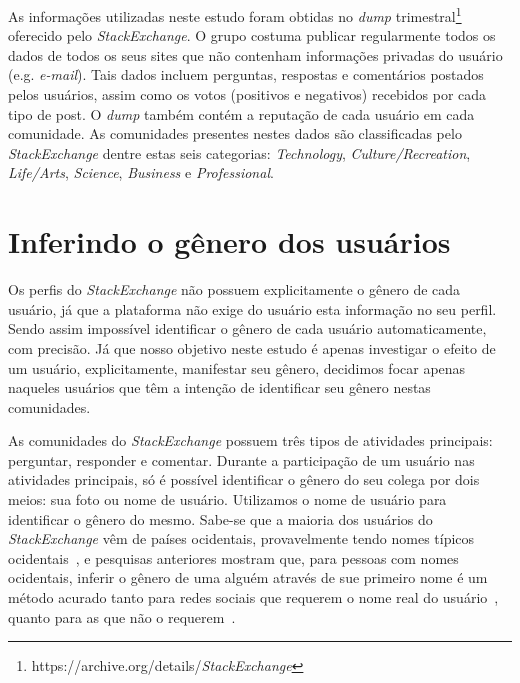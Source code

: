 As informações utilizadas neste estudo foram obtidas no \emph{dump} trimestral\footnote{https://archive.org/details/\emph{StackExchange}} oferecido pelo \emph{StackExchange}. O grupo costuma publicar regularmente todos os dados de todos os seus sites que não contenham informações privadas do usuário (e.g. \emph{e-mail}). Tais dados incluem perguntas, respostas e comentários postados pelos usuários, assim como os votos (positivos e negativos) recebidos por cada tipo de post. O \emph{dump} também contém a reputação de cada usuário em cada comunidade. As comunidades presentes nestes dados são classificadas pelo \emph{StackExchange} dentre estas seis categorias: \emph{Technology}, \emph{Culture/Recreation}, \emph{Life/Arts}, \emph{Science}, \emph{Business} e \emph{Professional}.

\section{Inferindo o gênero dos usuários}

Os perfis do \emph{StackExchange} não possuem explicitamente o gênero de cada usuário, já que a plataforma não exige do usuário esta informação no seu perfil. Sendo assim impossível identificar o gênero de cada usuário automaticamente, com precisão. Já que nosso objetivo neste estudo é apenas investigar o efeito de um usuário, explicitamente, manifestar seu gênero, decidimos focar apenas naqueles usuários que têm a intenção de identificar seu gênero nestas comunidades.

As comunidades do \emph{StackExchange} possuem três tipos de atividades principais: perguntar, responder e comentar. Durante a participação de um usuário nas atividades principais, só é possível identificar o gênero do seu colega por dois meios: sua foto ou nome de usuário. Utilizamos o nome de usuário para identificar o gênero do mesmo. Sabe-se que a maioria dos usuários do \emph{StackExchange} vêm de países ocidentais, provavelmente tendo nomes típicos ocidentais~\cite{schenk2013geo}, e pesquisas anteriores mostram que, para pessoas com nomes ocidentais, inferir o gênero de uma alguém através de sue primeiro nome é um método acurado tanto para redes sociais que requerem o nome real do usuário~\cite{tang2011s}, quanto para as que não o requerem~\cite{burger2011discriminating,liu2013s}.

